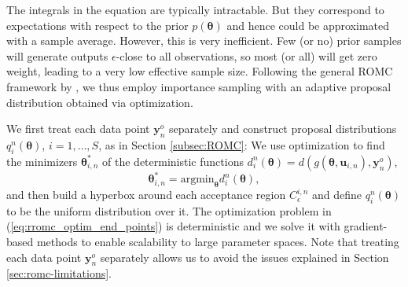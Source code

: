 \documentclass[twoside]{article}
\newcommand{\thb}{\boldsymbol{\theta}}
\newcommand{\ub}{\mathbf{u}}
\newcommand{\data}{\mathbf{y}^o}
\newcommand{\E}{\mathbb{E}}
\begin{document}


The integrals in the equation are typically intractable. But they correspond to expectations with respect to the prior $p(\thb)$ and hence could be approximated with a sample average. However, this is very inefficient. Few (or no) prior samples will generate outputs $\epsilon$-close to all observations, so most (or all) will get zero weight, leading to a very low effective sample size. Following the general ROMC framework by \citet{ikonomov2020robust}, we thus employ importance sampling with an adaptive proposal distribution obtained via optimization. 

We first treat each data point $\data_n$ separately and construct proposal distributions $q_i^n(\thb)$, $i=1, \ldots, S$, as in Section \ref{subsec:ROMC}: We use optimization to find the minimizers $\thb_{i,n}^*$ of the deterministic functions $d_i^n(\thb) = d(g(\thb, \ub_{i,n}), \data_n)$,       
\begin{equation}
 \thb_{i,n}^* = \text{argmin}_{\thb} d_i^n(\thb),
 \label{eq:rromc_optim_end_points}
\end{equation}
and then build a hyperbox around each acceptance region $C_{\epsilon}^{i,n}$ and define $q_i^n(\thb)$ to be the uniform distribution over it. The optimization problem in (\ref{eq:rromc_optim_end_points}) is deterministic and we solve it with gradient-based methods to enable scalability to large parameter spaces. Note that treating each data point $\data_n$ separately allows us to avoid the issues explained in Section \ref{sec:romc-limitations}.
\end{document}
